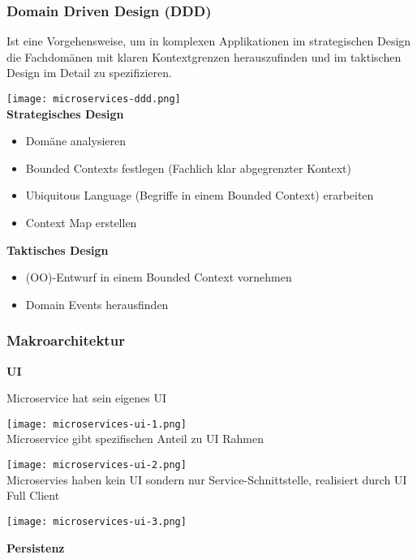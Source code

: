 \subsubsection{Domain Driven Design (DDD)}

Ist eine Vorgehensweise, um in komplexen Applikationen im strategischen Design die Fachdomänen mit klaren Kontextgrenzen herauszufinden und im taktischen Design im Detail zu spezifizieren.

\texttt{[image: microservices-ddd.png]} \\

\textbf{Strategisches Design}

\begin{itemize}
    \item Domäne analysieren
    \item Bounded Contexts festlegen (Fachlich klar abgegrenzter Kontext)
    \item Ubiquitous Language (Begriffe in einem Bounded Context) erarbeiten
    \item Context Map erstellen
\end{itemize}
\vspace{10pt}
\textbf{Taktisches Design}

\begin{itemize}
    \item (OO)-Entwurf in einem Bounded Context vornehmen
    \item Domain Events herausfinden
\end{itemize}

\subsubsection{Makroarchitektur}

\textbf{UI}

Microservice hat sein eigenes UI

\texttt{[image: microservices-ui-1.png]} \\

Microservice gibt spezifischen Anteil zu UI Rahmen

\texttt{[image: microservices-ui-2.png]} \\

Microservies haben kein UI sondern nur Service-Schnittstelle, realisiert durch UI Full Client

\texttt{[image: microservices-ui-3.png]}


\textbf{Persistenz}

